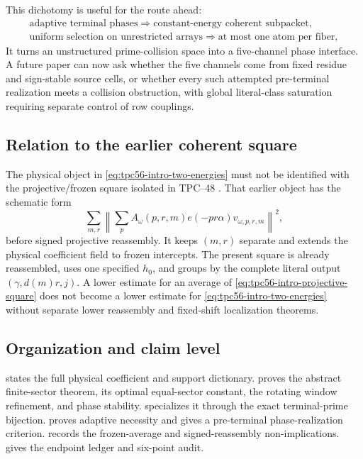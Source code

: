 This dichotomy is useful for the route ahead:
\begin{equation}
 \boxed{
 \begin{array}{c}
 \text{adaptive terminal phases}\Rightarrow
 \text{constant-energy coherent subpacket},\\[2pt]
 \text{uniform selection on unrestricted arrays}\Rightarrow
 \text{at most one atom per fiber},
 \end{array}}
 \label{eq:tpc56-intro-dichotomy}
\end{equation}
It turns an unstructured prime-collision space into a five-channel phase
interface.  A future paper can now ask whether the five channels come from
fixed residue and sign-stable source cells, or whether every such attempted
pre-terminal realization meets a collision obstruction, with global
literal-class saturation requiring separate control of row couplings.

\subsection{Relation to the earlier coherent square}

The physical object in \eqref{eq:tpc56-intro-two-energies} must not be
identified with the projective/frozen square isolated in TPC--48
\citep{WangTPC48}.  That earlier object has the schematic form
\begin{equation}
 \sum_{m,r}
 \left\|\sum_p A_\omega(p,r,m)
 e(-pr\alpha)v_{\omega,p,r,m}\right\|^2,
 \label{eq:tpc56-intro-projective-square}
\end{equation}
before signed projective reassembly.  It keeps \((m,r)\) separate and
extends the physical coefficient field to frozen intercepts.  The present
square is already reassembled, uses one specified \(h_0\), and groups by
the complete literal output \((\gamma,d(m)r,j)\).  A lower estimate for an
average of \eqref{eq:tpc56-intro-projective-square} does not become a lower
estimate for \eqref{eq:tpc56-intro-two-energies} without separate lower
reassembly and fixed-shift localization theorems.

\subsection{Organization and claim level}

 states the full physical coefficient and
support dictionary.   proves the abstract
finite-sector theorem, its optimal equal-sector constant, the rotating
window refinement, and phase stability.  
specializes it through the exact terminal-prime bijection.
 proves adaptive necessity and gives a
pre-terminal phase-realization criterion.  
records the frozen-average and signed-reassembly non-implications.
 gives the endpoint ledger and six-point audit.

